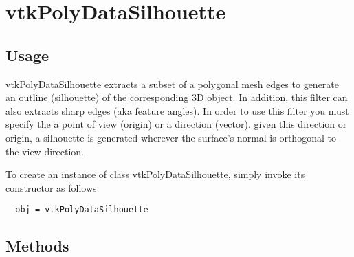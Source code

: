 \section{vtkPolyDataSilhouette}

\subsection{Usage}

 vtkPolyDataSilhouette extracts a subset of a polygonal mesh edges to
 generate an outline (silhouette) of the corresponding 3D object. In
 addition, this filter can also extracts sharp edges (aka feature angles).
 In order to use this filter you must specify the a point of view (origin) or
 a direction (vector).  given this direction or origin, a silhouette is
 generated wherever the surface's normal is orthogonal to the view direction.


To create an instance of class vtkPolyDataSilhouette, simply
invoke its constructor as follows
\begin{verbatim}
  obj = vtkPolyDataSilhouette
\end{verbatim}
\subsection{Methods}

